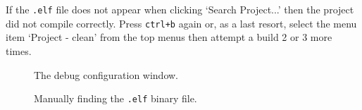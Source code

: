 \documentclass{UoNMCHA}
\numberwithin{equation}{section}
\begin{document}
\begin{enumerate}
    If the \texttt{.elf} file does not appear when clicking `Search Project...' then the project did not compile correctly. Press \texttt{ctrl+b} again or, as a last resort, select the menu item `Project - clean' from the top menus then attempt a build 2 or 3 more times. 
   
    \begin{figure}[H]
    \caption{The debug configuration window.}
    \label{fig:debug_noelf}
    \end{figure}

   \begin{figure}[H]
    \caption{Manually finding the \texttt{.elf} binary file.}
    \label{fig:elf_selection}
    \end{figure}


\end{enumerate}
\end{document}
